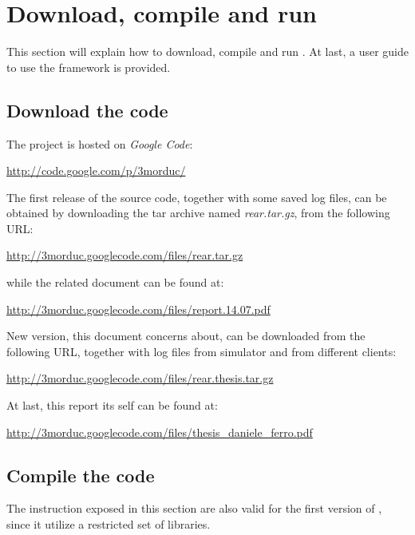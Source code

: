 \section{Download, compile and run \framework{}}
\label{sourcecode:downloadrun}

This section will explain how to download, compile and
run \framework{}. At last, a user guide to use the
framework is provided.

\subsection{Download the code}
\label{sourcecode:downloadrun:download}

The \framework{} project is hosted on \textit{Google Code}:

\begin{center}
  \url{http://code.google.com/p/3morduc/}
\end{center}

The first release of the source code, together with
some saved log files, can be obtained by downloading
the tar archive named \textit{rear.tar.gz}, from the
following URL:

\begin{center}
\url{http://3morduc.googlecode.com/files/rear.tar.gz}
\end{center}

while the related document can be found at:

\begin{center}
\url{http://3morduc.googlecode.com/files/report.14.07.pdf}
\end{center}

New \framework{} version, this document concerns about,
can be downloaded from the following URL, together with
log files from \morduc{} simulator and from different \morduc{}
clients:

\begin{center}
\url{http://3morduc.googlecode.com/files/rear.thesis.tar.gz}
\end{center}

At last, this report its self can be found at:

\begin{center}
\url{http://3morduc.googlecode.com/files/thesis_daniele_ferro.pdf}
\end{center}

\subsection{Compile the code}
\label{sourcecode:downloadrun:compile}

The instruction exposed in this section are also valid for the
first version of \framework{}, since it utilize a restricted
set of libraries.

